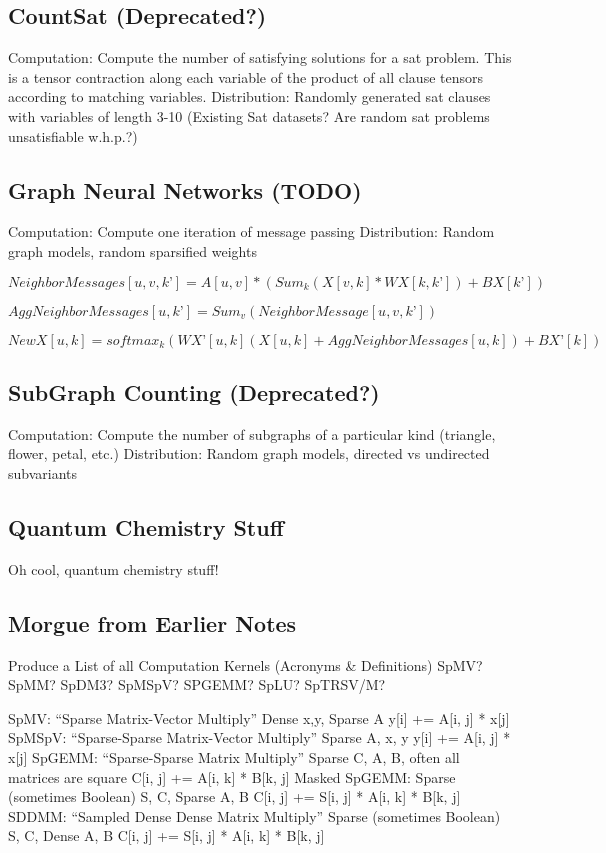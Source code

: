 \subsection{CountSat (Deprecated?)}
	Computation: Compute the number of satisfying solutions for a sat problem. This is a tensor contraction along each variable of the product of all clause tensors according to matching variables.
	Distribution: Randomly generated sat clauses with variables of length 3-10 (Existing Sat datasets? Are random sat problems unsatisfiable w.h.p.?)

\subsection{Graph Neural Networks (TODO)}
	Computation: Compute one iteration of message passing
	Distribution: Random graph models, random sparsified weights

$NeighborMessages[u, v, k’] = A[u, v]*(Sum_k(X[v, k]*WX[k, k’]) +BX[k’])  $

$AggNeighborMessages[u, k’] = Sum_v(NeighborMessage[u, v, k’])$

$NewX[u, k] = softmax_k(WX’[u,k](X[u, k] +AggNeighborMessages[u,k]) + BX’[k]) $

\subsection{SubGraph Counting (Deprecated?)}
	Computation: Compute the number of subgraphs of a particular kind (triangle, flower, petal, etc.)
	Distribution: Random graph models, directed vs undirected subvariants


\subsection{Quantum Chemistry Stuff}
Oh cool, quantum chemistry stuff!

\subsection{Morgue from Earlier Notes}

Produce a List of all Computation Kernels (Acronyms \& Definitions)
SpMV? SpMM? SpDM3? SpMSpV? SPGEMM? SpLU? SpTRSV/M?

SpMV:
	“Sparse Matrix-Vector Multiply”
Dense x,y, Sparse A
y[i] += A[i, j] * x[j]
SpMSpV:
	“Sparse-Sparse Matrix-Vector Multiply”
Sparse A, x, y
y[i] += A[i, j] * x[j]
SpGEMM:
	“Sparse-Sparse Matrix Multiply”
Sparse C, A, B, often all matrices are square
C[i, j] += A[i, k] * B[k, j]
Masked SpGEMM:
	Sparse (sometimes Boolean) S, C, Sparse A, B
C[i, j] += S[i, j] * A[i, k] * B[k, j]
SDDMM:
	“Sampled Dense Dense Matrix Multiply”
	Sparse (sometimes Boolean) S, C, Dense A, B
C[i, j] += S[i, j] * A[i, k] * B[k, j]

